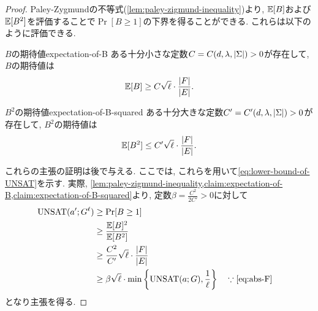 \begin{proof}
Paley-Zygmundの不等式(\cref{lem:paley-zigmund-inequality})より, $\operatorname*{\mathbb{E}}[B]$および$\operatorname*{\mathbb{E}}[B^2]$を評価することで$\Pr[B\ge 1]$の下界を得ることができる.
これらは以下のように評価できる. 

\begin{claim}{$B$の期待値}{expectation-of-B}
  ある十分小さな定数$C=C(d,\lambda,\abs{\Sigma})>0$が存在して, $B$の期待値は
  \begin{align*}
    \operatorname*{\mathbb{E}}[B] \ge C\sqrt{\ell} \cdot \frac{\abs{F}}{\abs{E}}.
  \end{align*}
\end{claim}

\begin{claim}{$B^2$の期待値}{expectation-of-B-squared}
  ある十分大きな定数$C'=C'(d,\lambda,\abs{\Sigma})>0$が存在して, $B^2$の期待値は
  \begin{align*}
    \operatorname*{\mathbb{E}}[B^2] \le C'\sqrt{\ell} \cdot \frac{\abs{F}}{\abs{E}}.
  \end{align*}
\end{claim}

これらの主張の証明は後で与える.
ここでは, これらを用いて\cref{eq:lower-bound-of-UNSAT}を示す.
実際, \cref{lem:paley-zigmund-inequality,claim:expectation-of-B,claim:expectation-of-B-squared}より, 定数$\beta=\frac{C^2}{2C'}>0$に対して
\begin{align*}
  \UNSAT(a';G^\ell) &\ge \Pr[B\ge 1] \\
  &\ge \frac{\E[B]^2}{\E[B^2]} \\
  &\ge \frac{C^2}{C'} \sqrt{\ell} \cdot \frac{\abs{F}}{\abs{E}} \\
  & \ge \beta \sqrt{\ell} \cdot \min\qty{ \UNSAT(a;G), \frac{1}{\ell} } & & \because \text{\cref{eq:abs-F}}
\end{align*}
となり主張を得る.

\end{proof}

